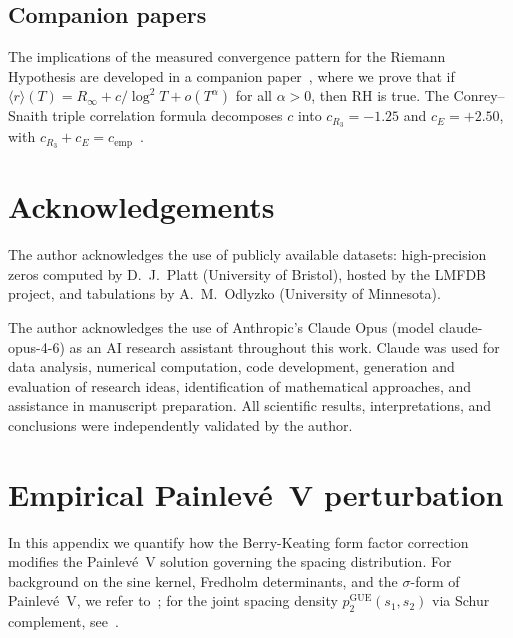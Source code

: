 \documentclass[11pt]{article}
\theoremstyle{plain}
\theoremstyle{remark}
\begin{document}
\subsection{Companion papers}

The implications of the measured convergence pattern for the Riemann
Hypothesis are developed in a companion paper~\cite{alarcon2026c}, where
we prove that if $\langle r\rangle(T) = R_\infty + c/\log^2 T + o(T^\alpha)$
for all $\alpha > 0$, then RH is true. The Conrey--Snaith triple
correlation formula decomposes $c$ into $c_{R_3} = -1.25$ and
$c_E = +2.50$, with $c_{R_3} + c_E = c_{\mathrm{emp}}$~\cite{alarcon2026b}.


\section*{Acknowledgements}

The author acknowledges the use of publicly available datasets:
high-precision zeros computed by D.~J.~Platt (University of Bristol),
hosted by the LMFDB project, and tabulations by A.~M.~Odlyzko
(University of Minnesota).

The author acknowledges the use of Anthropic's Claude Opus
(model claude-opus-4-6) as an AI research assistant throughout this work.
Claude was used for data analysis, numerical computation, code development,
generation and evaluation of research ideas, identification of mathematical
approaches, and assistance in manuscript preparation.
All scientific results, interpretations, and conclusions were independently
validated by the author.






\appendix

\section{Empirical Painlev\'e~V perturbation}
\label{app:painleve}

In this appendix we quantify how the Berry-Keating form factor correction
modifies the Painlev\'e~V solution governing the spacing distribution.
For background on the sine kernel, Fredholm determinants, and the
$\sigma$-form of Painlev\'e~V, we refer to~\cite{tracywidom1994,
jimbo1981, alarcon2026c}; for the joint spacing density
$p_2^{\mathrm{GUE}}(s_1,s_2)$ via Schur complement,
see~\cite{alarcon2026b, bornemann2010}.
\end{document}
